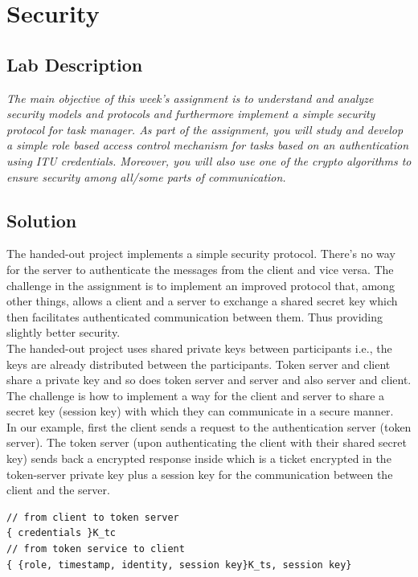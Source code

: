 \chapter{Security}
\minitoc

\section{Lab Description}
\textit{The main objective of this week's assignment is to understand and analyze security models and protocols and furthermore implement a simple security protocol for task manager. As part of the assignment, you will study and develop a simple role based access control mechanism for tasks based on an authentication using ITU credentials. Moreover, you will also use one of the crypto algorithms to ensure security among all/some parts of communication.}

\section{Solution}

The handed-out project implements a simple security protocol. There's no way for the server to authenticate the messages from the client and vice versa. The challenge in the assignment is to implement an improved protocol that, among other things, allows a client and a server to exchange a shared secret key which then facilitates authenticated communication between them. Thus providing slightly better security.  \\

The handed-out project uses shared private keys between participants i.e., the keys are already distributed between the participants. Token server and client share a private key and so does token server and server and also server and client. The challenge is how to implement a way for the client and server to share a secret key (session key) with which they can communicate in a secure manner. \\

In our example, first the client sends a request to the authentication server (token server). The token server (upon authenticating the client with their shared secret key) sends back a encrypted response inside which is a ticket encrypted in the token-server private key plus a session key for the communication between the client and the server. \\

\begin{lstlisting}
// from client to token server
{ credentials }K_tc
// from token service to client
{ {role, timestamp, identity, session key}K_ts, session key} 
\end{lstlisting}

